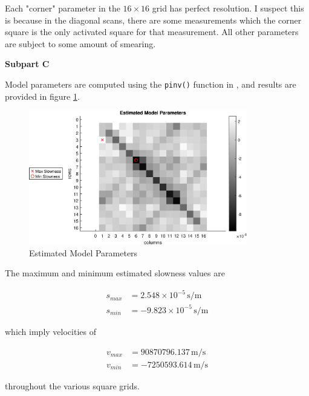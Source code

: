 Each "corner" parameter in the $16 \times 16$ grid has perfect resolution. I suspect this is because in the diagonal scans, there are some measurements which the corner square is the only activated square for that measurement. All other parameters are subject to some amount of smearing. \newline

\textbf{Subpart C} \newline

Model parameters are computed using the \verb|pinv()| function in \MATLAB, and results are provided in figure \ref{fig: prob2 part B estimated model parameters}.

\begin{figure}[h] 
	\centering
	\includegraphics[width=0.85\textwidth]{./images/prob2_partB_estimated_model_parameters.eps}
	\caption{Estimated Model Parameters}
	\label{fig: prob2 part B estimated model parameters}
\end{figure}
\FloatBarrier

The maximum and minimum estimated slowness values are 

\begin{align*}
	s_{max} &= 2.548 \times 10^{-5} \, \unit{\second\per\meter} \\
	s_{min} &= -9.823 \times 10^{-5} \, \unit{\second\per\meter}
\end{align*}

which imply velocities of

\begin{align*}
	v_{max} &= 90870796.137 \, \unit{\meter\per\second} \\
	v_{min} &= -7250593.614 \, \unit{\meter\per\second}
\end{align*}

throughout the various square grids. 

